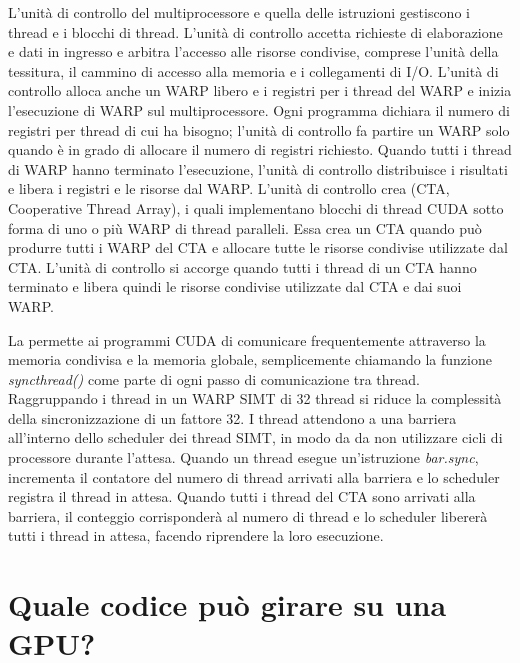 L'unità di controllo del multiprocessore e quella delle istruzioni gestiscono i thread e i blocchi di thread. L'unità di controllo accetta richieste di elaborazione e dati in ingresso e arbitra l'accesso alle risorse condivise, comprese l'unità della tessitura, il cammino di accesso alla memoria e i collegamenti di I/O. L'unità di controllo alloca anche un WARP libero e i registri per i thread del WARP e inizia l'esecuzione di WARP sul multiprocessore. Ogni programma dichiara il numero di registri per thread di cui ha bisogno; l'unità di controllo fa partire  un WARP solo quando è in grado di allocare il numero di registri richiesto. Quando tutti i thread di WARP hanno terminato l'esecuzione, l'unità di controllo distribuisce i risultati e libera i registri e le risorse dal WARP.  L'unità di controllo crea  (CTA, Cooperative Thread Array), i quali implementano blocchi di thread CUDA sotto forma di uno o più WARP di thread paralleli. Essa crea un CTA quando può produrre tutti i WARP del CTA e allocare tutte le risorse condivise utilizzate dal CTA. L'unità di controllo si accorge quando tutti i thread di un CTA hanno terminato e libera quindi le risorse condivise utilizzate dal CTA e dai suoi WARP. 

La  permette ai programmi CUDA di comunicare frequentemente attraverso la memoria condivisa e la memoria globale, semplicemente chiamando la funzione \textit{syncthread()} come parte di ogni passo di comunicazione tra thread. Raggruppando i thread in un WARP SIMT di 32 thread si riduce la complessità della sincronizzazione di un fattore 32. I thread attendono a una barriera all'interno dello scheduler dei thread SIMT, in modo da da non utilizzare cicli di processore durante l'attesa. Quando un thread esegue un'istruzione \textit{bar.sync}, incrementa il contatore del numero di thread arrivati alla barriera e lo scheduler registra il thread in attesa. Quando tutti i thread del CTA sono arrivati alla barriera, il conteggio corrisponderà al numero di thread e lo scheduler libererà tutti i thread in attesa, facendo riprendere la loro esecuzione.


\section{Quale codice può girare su una GPU?}

